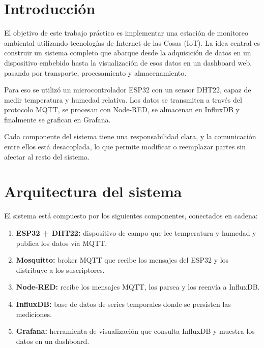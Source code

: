 \documentclass[12pt, a4paper]{article}
\begin{document}
\section{Introducción}

El objetivo de este trabajo práctico es implementar una estación de monitoreo ambiental
utilizando tecnologías de Internet de las Cosas (IoT). La idea central es construir un
sistema completo que abarque desde la adquisición de datos en un dispositivo embebido
hasta la visualización de esos datos en un dashboard web, pasando por transporte,
procesamiento y almacenamiento.

Para eso se utilizó un microcontrolador ESP32 con un sensor DHT22, capaz de medir
temperatura y humedad relativa. Los datos se transmiten a través del protocolo MQTT,
se procesan con Node-RED, se almacenan en InfluxDB y finalmente se grafican en Grafana.

Cada componente del sistema tiene una responsabilidad clara, y la comunicación entre
ellos está desacoplada, lo que permite modificar o reemplazar partes sin afectar al
resto del sistema.

\section{Arquitectura del sistema}

El sistema está compuesto por los siguientes componentes, conectados en cadena:

\begin{enumerate}
    \item \textbf{ESP32 + DHT22:} dispositivo de campo que lee temperatura y humedad
          y publica los datos vía MQTT.
    \item \textbf{Mosquitto:} broker MQTT que recibe los mensajes del ESP32 y los
          distribuye a los suscriptores.
    \item \textbf{Node-RED:} recibe los mensajes MQTT, los parsea y los reenvía a
          InfluxDB.
    \item \textbf{InfluxDB:} base de datos de series temporales donde se persisten
          las mediciones.
    \item \textbf{Grafana:} herramienta de visualización que consulta InfluxDB y
          muestra los datos en un dashboard.
\end{enumerate}
\end{document}
